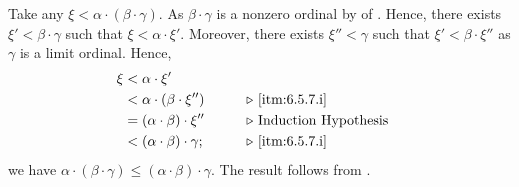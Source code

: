 \documentclass[../introduction_to_set_theory_Note.tex]{subfiles}
\begin{document}
{    Take any \(\xi < \alpha \cdot (\beta \cdot \gamma)\).
    As \(\beta \cdot \gamma\) is a nonzero ordinal by  of .
    Hence, there exists \(\xi' < \beta \cdot \gamma\)
    such that \(\xi < \alpha \cdot \xi'\).
    Moreover, there exists \(\xi'' < \gamma\) such that \(\xi' < \beta \cdot \xi''\)
    as \(\gamma\) is a limit ordinal.
    Hence,
    \begin{alignat*}{2}
        \xi
        &< \alpha \cdot \xi' &\qquad \\
        &< \alpha \cdot (\beta \cdot \xi'') && \comment*{\ref{itm:6.5.7.i}} \\
        &= (\alpha \cdot \beta) \cdot \xi'' && \comment*{Induction Hypothesis} \\
        &< (\alpha \cdot \beta) \cdot \gamma; && \comment*{\ref{itm:6.5.7.i}}
    \end{alignat*}
    we have \(\alpha \cdot (\beta \cdot \gamma) \le (\alpha \cdot \beta) \cdot \gamma\).
    The result follows from .
}
\end{document}
